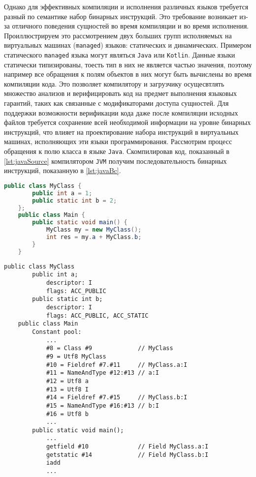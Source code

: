 Однако для эффективных компиляции и исполнения различных языков требуется разный по семантике набор бинарных инструкций. Это требование возникает из-за отличного поведения сущностей во время компиляции и во время исполнения. Проиллюстрируем это рассмотрением двух больших групп исполняемых на виртуальных машинах (\texttt{managed}) языков: статических и динамических. Примером статического \texttt{managed} языка могут являться \texttt{Java} или \texttt{Kotlin}. Данные языки статически типизированы, тоесть тип в них не является частью значения, поэтому например все обращения к полям объектов в них могут быть вычислены во время компиляции кода. Это позволяет компилятору и загрузчику осущесвтлять множество анализов и верифицировать код на предмет выполнения языковых гарантий, таких как связанные с модификаторами доступа сущностей. Для поддержки возможности верификации кода даже после компиляции исходных файлов требуется сохранение всей необходимой информации на уровне бинарных инструкций, что влияет на проектирование набора инструкций в виртуальных машинах, исполняющих эти языки программирования. Рассмотрим процесс обращения к полю класса в языке \texttt{Java}. Скомпилировав код, показанный в \autoref{lst:javaSource} компилятором \texttt{JVM} получим последовательность бинарных инструкций, показанную в \autoref{lst:javaBc}.

\begin{lstlisting}[language=Java, caption=Исходный код языка \texttt{Java}., label=lst:javaSource]
    public class MyClass {
        public int a = 1;
        public static int b = 2;
    };
    public class Main {
        public static void main() {
            MyClass my = new MyClass();
            int res = my.a + MyClass.b;
        }
    }
\end{lstlisting}

\begin{lstlisting}[caption=Бинарный код виртуальной машины \texttt{JVM}., label=lst:javaBc]
    public class MyClass
        public int a;
            descriptor: I
            flags: ACC_PUBLIC
        public static int b;
            descriptor: I
            flags: ACC_PUBLIC, ACC_STATIC
    public class Main
        Constant pool:
            ...
            #8 = Class #9             // MyClass
            #9 = Utf8 MyClass
            #10 = Fieldref #7.#11     // MyClass.a:I
            #11 = NameAndType #12:#13 // a:I
            #12 = Utf8 a
            #13 = Utf8 I
            #14 = Fieldref #7.#15     // MyClass.b:I
            #15 = NameAndType #16:#13 // b:I
            #16 = Utf8 b
            ...
        public static void main();
            ...
            getfield #10              // Field MyClass.a:I
            getstatic #14             // Field MyClass.b:I
            iadd
            ...
\end{lstlisting}

